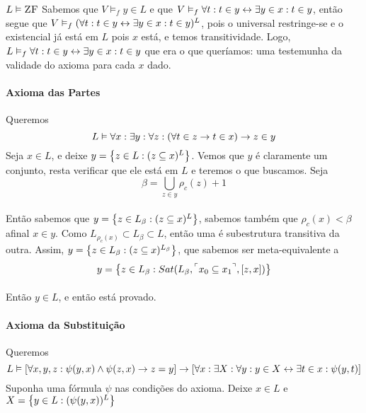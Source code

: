 \begin{theorem}{$L\vDash\text{\sc ZF}$}
                Sabemos que $V\vDash_f y\in L$ e que $V\vDash_f\forall t: t\in y\leftrightarrow\exists y\in x: t\in y$, então segue que 
                $V\vDash_f(\forall t: t\in y\leftrightarrow\exists y\in x: t\in y)^L$, pois o universal restringe-se e o existencial 
                já está em $L$ pois $x$ está, e temos transitividade. Logo, $L\vDash_f\forall t: t\in y\leftrightarrow\exists y\in x: t\in y$
                que era o que queríamos: uma testemunha da validade do axioma para cada $x$ dado.
            \paragraph{Axioma das Partes}\nl
                Queremos
                $$L\vDash\forall x:\exists y:\forall z:(\forall t\in z\rightarrow t\in x)\rightarrow z\in y$$
                Seja $x\in L$, e deixe $y = \SET{z\in L: (z\subseteq x)^L}$. Vemos que $y$ é 
                claramente um conjunto, resta verificar que ele está em $L$ e teremos o que 
                buscamos. Seja  
                $$\beta = \bigcup_{z\in y}\rho_c(z)+1$$
                \paragraph{}
                    Então sabemos que $y = \SET{z\in L_\beta : (z\subseteq x)^L}$, sabemos também que 
                    $\rho_c(x)<\beta$ afinal $x\in y$. Como $L_{\rho_c (x)}\subset L_\beta\subset L$, 
                    então uma é subestrutura transitiva da outra. Assim, $y = \SET{z\in L_\beta : 
                    (z\subseteq x)^{L_\beta}}$, que sabemos ser meta-equivalente a
                $$y = \SET{z\in L_\beta : Sat(L_\beta, \FMLA{x_0\subseteq x_1}, [z, x])}$$
                \paragraph{}
                    Então $y\in L$, e então está provado.
            \paragraph{Axioma da Substituição}\nl
                Queremos
                $$L\vDash[\forall x, y, z:\psi(y, x)\land\psi(z,x)\rightarrow z=y]\rightarrow[\forall x:\exists X:\forall y: y\in X\leftrightarrow\exists t\in x:\psi(y,t)]$$
                Suponha uma fórmula $\psi$ nas condições do axioma. Deixe $x\in L$ e $X=\SET{y\in L:(\psi(y,x))^L}$

        \end{theorem}
        


